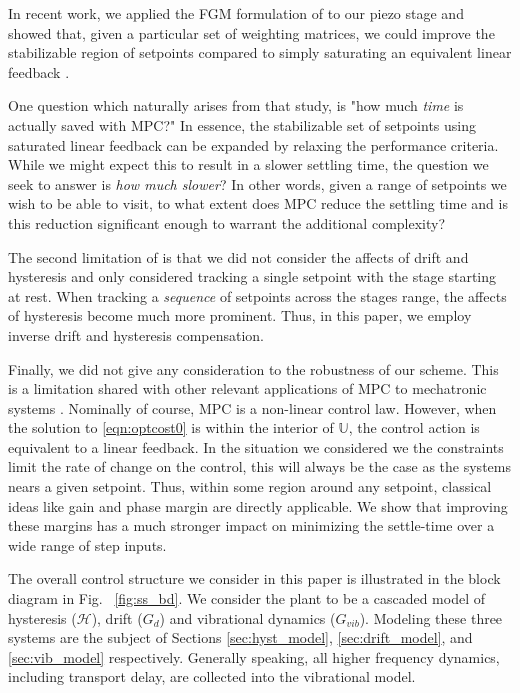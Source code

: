 \documentclass[journal,twocolumn,twoside]{IEEEtran}
\begin{document}
In recent work, we applied the FGM formulation of \cite{Jerez_Trans_2014} to our piezo stage and showed that, given a particular set of weighting matrices, we could improve the stabilizable region of setpoints compared to simply saturating an equivalent linear feedback \cite{braker_application_2017}.

One question which naturally arises from that study, is "how much \emph{time} is actually saved with MPC?" In essence, the stabilizable set of setpoints using saturated linear feedback can be expanded by relaxing the performance criteria. While we might expect this to result in a slower settling time, the question we seek to answer is \emph{how much slower}? In other words, given a range of setpoints we wish to be able to visit, to what extent does MPC reduce the settling time and is this reduction significant enough to warrant the additional complexity?


The second limitation of \cite{braker_application_2017} is that we did not consider the affects of drift and hysteresis and only considered tracking a single setpoint with the stage starting at rest. When tracking a \emph{sequence} of setpoints across the stages range, the affects of hysteresis become much more prominent. Thus, in this paper, we employ inverse drift and hysteresis compensation.

Finally, we did not give any consideration to the robustness of our scheme. This is a limitation shared with other relevant applications of MPC to mechatronic systems \cite{Wills_CDC_2005, Lin_ASME_2012, rana_design_2014}. Nominally of course, MPC is a non-linear control law. However, when the solution to \eqref{eqn:optcost0} is within the interior of $\mathds{U}$, the control action is equivalent to a linear feedback. In the situation we considered we the constraints limit the rate of change on the control, this will always be the case as the systems nears a given setpoint. Thus, within some region around any setpoint, classical ideas like gain and phase margin are directly applicable. We show that improving these margins has a much stronger impact on minimizing the settle-time over a wide range of step inputs.


The overall control structure we consider in this paper is illustrated in the block diagram in Fig. ~\ref{fig:ss_bd}. We consider the plant to be a cascaded model of hysteresis ($\mathcal{H}$),  drift ($G_d$) and vibrational dynamics ($G_{vib}$). Modeling these three systems are the subject of Sections \ref{sec:hyst_model}, \ref{sec:drift_model}, and \ref{sec:vib_model} respectively. Generally speaking, all higher frequency dynamics, including transport delay, are collected into the vibrational model.
\end{document}
